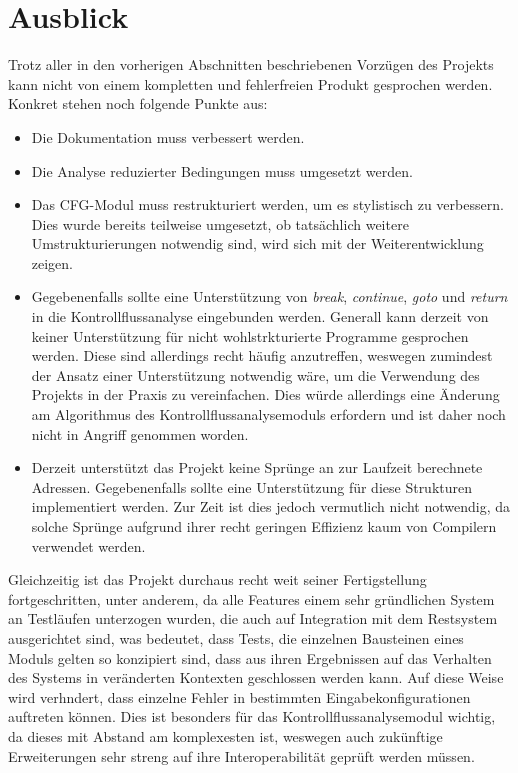 \documentclass[11pt]{article} %
\begin{document}
\section{Ausblick}
Trotz aller in den vorherigen Abschnitten beschriebenen Vorzügen des Projekts kann nicht von
einem kompletten und fehlerfreien Produkt gesprochen werden. Konkret stehen noch folgende Punkte aus:
\begin{itemize}
	\item{Die Dokumentation muss verbessert werden.}
	\item{Die Analyse reduzierter Bedingungen muss umgesetzt werden.}
	\item{Das CFG-Modul muss restrukturiert werden, um es stylistisch zu verbessern. Dies wurde
		bereits teilweise umgesetzt, ob tatsächlich weitere Umstrukturierungen notwendig sind,
		wird sich mit der Weiterentwicklung zeigen.}
	\item{Gegebenenfalls sollte eine Unterstützung von \textit{break}, \textit{continue},
		\textit{goto} und \textit{return} in die Kontrollflussanalyse eingebunden werden.
		Generall kann derzeit von keiner Unterstützung für nicht wohlstrkturierte Programme
		gesprochen werden. Diese sind allerdings recht häufig anzutreffen, weswegen zumindest
		der Ansatz einer Unterstützung notwendig wäre, um die Verwendung des Projekts in der
		Praxis zu vereinfachen. Dies würde allerdings eine Änderung am Algorithmus des
		Kontrollflussanalysemoduls erfordern und ist daher noch nicht in Angriff genommen worden.
	}
	\item{Derzeit unterstützt das Projekt keine Sprünge an zur Laufzeit berechnete Adressen. Gegebenenfalls
		sollte eine Unterstützung für diese Strukturen implementiert werden. Zur Zeit ist dies
		jedoch vermutlich nicht notwendig, da solche Sprünge aufgrund ihrer recht geringen Effizienz
		kaum von Compilern verwendet werden.}
\end{itemize}
Gleichzeitig ist das Projekt durchaus recht weit seiner Fertigstellung fortgeschritten, unter
anderem, da alle Features einem sehr gründlichen System an Testläufen unterzogen wurden, die auch
auf Integration mit dem Restsystem ausgerichtet sind, was bedeutet, dass Tests, die einzelnen
Bausteinen eines Moduls gelten so konzipiert sind, dass aus ihren Ergebnissen auf das Verhalten des
Systems in veränderten Kontexten geschlossen werden kann. Auf diese Weise wird verhndert, dass
einzelne Fehler in bestimmten Eingabekonfigurationen auftreten können. Dies ist besonders für das
Kontrollflussanalysemodul wichtig, da dieses mit Abstand am komplexesten ist, weswegen auch
zukünftige Erweiterungen sehr streng auf ihre Interoperabilität geprüft werden müssen.



\end{document}
